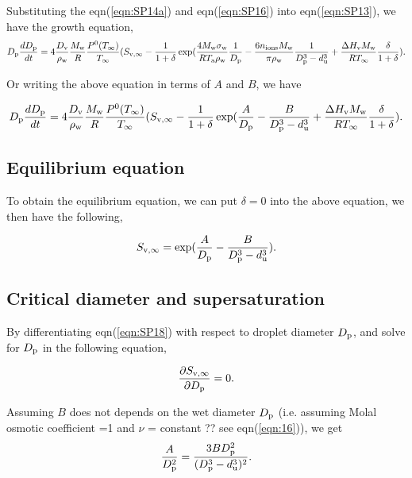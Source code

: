 \documentclass[12pt]{article}
\begin{document}
Substituting the eqn(\ref{eqn:SP14a}) and eqn(\ref{eqn:SP16}) into eqn(\ref{eqn:SP13}), we have
the growth equation, 
\begin{equation}\label{eqn:SP17a}
D_{\rm p}\frac{dD_{\rm p}}{dt}=4 \frac{D_{\rm v}} {\rho_{\rm w}} \frac{M_{\rm w}}{R} \frac{P^{\rm 0}(T_{\infty})} {T_{\infty}} (S_{\rm v, \infty} - \frac{1}{1+\delta} \exp(\frac{4 M_{\rm w}\sigma_{\rm w}}{R T_{\rm a} \rho_{\rm w}}\frac{1}{D_{\rm p}}-\frac{6 n_{\rm ions} M_{\rm w}}{\pi \rho_{\rm w}} \frac{1}{D_{\rm p}^{3}-d_{\rm u}^{3}}+\frac{\Delta H_{\rm v} M_{\rm w}}{R T_{\infty}} \frac{\delta}{1+\delta}).
\end{equation}

Or writing the above equation in terms of  $A$ and $B$, we have

\begin{equation}\label{eqn:17b}
D_{\rm p}\frac{dD_{\rm p}}{dt}=4 \frac{D_{\rm v}} {\rho_{\rm w}} \frac{M_{\rm w}}{R} \frac{P^{\rm 0}(T_{\infty})} {T_{\infty}} (S_{\rm v, \infty} - \frac{1}{1+\delta} \exp(\frac{A}{D_{\rm p}}- \frac{B}{D_{\rm p}^{3}-d_{\rm u}^{3}}+\frac{\Delta H_{\rm v} M_{\rm w}}{R T_{\infty}} \frac{\delta}{1+\delta}).
\end{equation}
\subsection{Equilibrium equation}
To obtain the equilibrium equation, we can put $\delta=0$ into the above equation,  we then have the following,

\begin{equation}\label{eqn:SP18}
S_{\rm v, \infty} = \exp(\frac{A}{D_{\rm p}}- \frac{B}{D_{\rm p}^{3}-d_{\rm u}^{3}}).
\end{equation}


\subsection{Critical diameter and supersaturation} 

By differentiating eqn(\ref{eqn:SP18}) with respect to droplet diameter $D_{\rm p}$, and solve for $D_{\rm p}$ in the following equation,  

\begin{equation}\label{eqn:SP19}
\frac{\partial S_{\rm v, \infty}}{\partial D_{\rm p}}=0.
\end{equation}

Assuming $B$ does not depends on the wet diameter $D_{\rm p}$ (i.e. assuming Molal osmotic coefficient =1 and $\nu$ = constant ?? see eqn(\ref{eqn:16})),  we get
\begin{equation}\label{eqn:SP20}
\frac{A}{D_{\rm p}^{2}}=\frac{3 B D_{\rm p}^{2}}{(D_{\rm p}^{3}- d_{\rm u}^{3})^{2}}.
\end{equation} 
\end{document}
